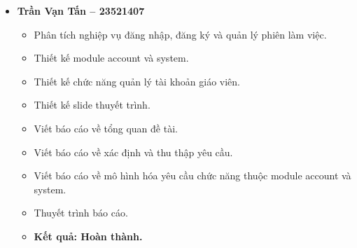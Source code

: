 \documentclass[12pt,a4paper]{article}
\begin{document}
\begin{itemize}[leftmargin=*]
    \item \textbf{Trần Vạn Tấn -- 23521407}
    \begin{itemize}
        \item Phân tích nghiệp vụ đăng nhập, đăng ký và quản lý phiên làm việc.
        \item Thiết kế module account và system.
        \item Thiết kế chức năng quản lý tài khoản giáo viên.
        \item Thiết kế slide thuyết trình.
        \item Viết báo cáo về tổng quan đề tài.
        \item Viết báo cáo về xác định và thu thập yêu cầu.
        \item Viết báo cáo về mô hình hóa yêu cầu chức năng thuộc module account và system.
        \item Thuyết trình báo cáo.
        \item \textbf{Kết quả: Hoàn thành.}
    \end{itemize}
\end{itemize}
\end{document}
